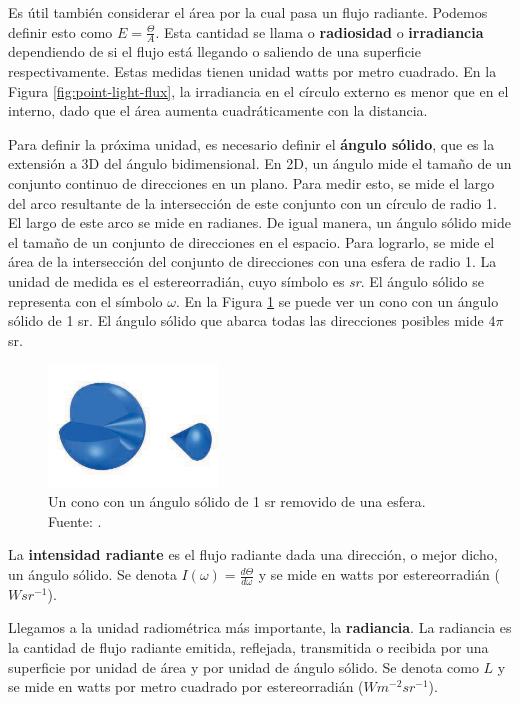 Es útil también considerar el área por la cual pasa un flujo radiante.
Podemos definir esto como $E = \frac{\Theta}{A}$.
Esta cantidad se llama o \textbf{radiosidad} o \textbf{irradiancia} dependiendo de si el flujo está llegando o saliendo de una superficie respectivamente.
Estas medidas tienen unidad watts por metro cuadrado.
En la Figura \ref{fig:point-light-flux}, la irradiancia en el círculo externo es menor que en el interno, dado que el área aumenta cuadráticamente con la distancia.

Para definir la próxima unidad, es necesario definir el \textbf{ángulo sólido}, que es la extensión a 3D del ángulo bidimensional.
En 2D, un ángulo mide el tamaño de un conjunto continuo de direcciones en un plano.
Para medir esto, se mide el largo del arco resultante de la intersección de este conjunto con un círculo de radio 1.
El largo de este arco se mide en radianes.
De igual manera, un ángulo sólido mide el tamaño de un conjunto de direcciones en el espacio.
Para lograrlo, se mide el área de la intersección del conjunto de direcciones con una esfera de radio 1.
La unidad de medida es el estereorradián, cuyo símbolo es \textit{sr}.
El ángulo sólido se representa con el símbolo $\omega$.
En la Figura \ref{fig:steradian} se puede ver un cono con un ángulo sólido de 1 sr.
El ángulo sólido que abarca todas las direcciones posibles mide $4\pi$ sr.

\begin{figure}[ht]
    \centering
    \includegraphics[width=0.4\textwidth]{steradians.png}
    \caption{Un cono con un ángulo sólido de 1 sr removido de una esfera. Fuente: \cite{rtr}.}
    \label{fig:steradian}
\end{figure}

La \textbf{intensidad radiante} es el flujo radiante dada una dirección, o mejor dicho, un ángulo sólido.
Se denota $I(\omega) = \frac{d\Theta}{d\omega}$ y se mide en watts por estereorradián ($W sr^{-1}$).

Llegamos a la unidad radiométrica más importante, la \textbf{radiancia}.
La radiancia es la cantidad de flujo radiante emitida, reflejada, transmitida o recibida por una superficie por unidad de área y por unidad de ángulo sólido.
Se denota como $L$ y se mide en watts por metro cuadrado por estereorradián ($W m^{-2} sr^{-1}$).

